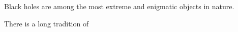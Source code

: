 

Black holes are among the most extreme and enigmatic objects in nature. %


There is a long tradition of 